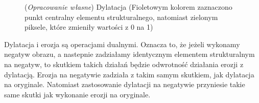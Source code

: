 \documentclass{article}
\begin{document}
        \begin{figure}[H]
            \centering
            \qquad
            \qquad
            \caption
            {
                (\textit{Opracowanie własne}) Dylatacja (Fioletowym kolorem zaznaczono punkt centralny elementu strukturalnego, natomiast zielonym piksele, które zmieniły wartości z 0 na 1)
            }
            \label{dylatacja}
        \end{figure}

        {
            \Large
            \justifying
            \quad
            Dylatacja i erozja są operacjami dualnymi.
            Oznacza to, że jeżeli wykonamy negatyw obrazu, a nastepnie zadziałamy identycznym elementem strukturalnym na negatyw, to skutkiem takich działań będzie odwrotność działania erozji z dylatacją.
            Erozja na negatywie zadziała z takim samym skutkiem, jak dylatacja na oryginale.
            Natomiast zastosowanie dylatacji na negatywie przyniesie takie same skutki jak wykonanie erozji na oryginale.
        }

        \vspace{0.5cm}
\end{document}

